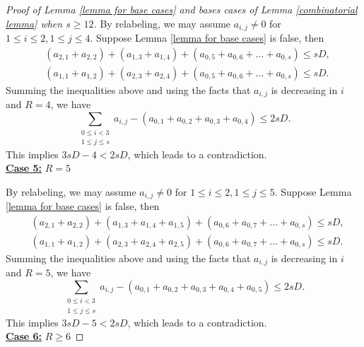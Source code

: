 \documentclass[10pt,a4paper]{amsart}
\begin{document}
\begin{proof}[Proof of Lemma \ref{lemma for base cases} and bases cases of Lemma \ref{combinatorial lemma} when $s\geq 12$]
    By relabeling, we may assume $a_{i,j}\neq 0$ for $1\leq i\leq 2,1\leq j\leq 4$. Suppose Lemma \ref{lemma for base cases} is false, then
    \begin{align*}
        &(a_{2,1}+a_{2,2})+(a_{1,3}+a_{1,4})+(a_{0,5}+a_{0,6}+...+a_{0,s})\leq sD,\\
        &(a_{1,1}+a_{1,2})+(a_{2,3}+a_{2,4})+(a_{0,5}+a_{0,6}+...+a_{0,s})\leq sD.
    \end{align*}
    Summing the inequalities above and using the facts that $a_{i,j}$ is decreasing in $i$ and $R=4$, we have
    \begin{equation*}
        \sum_{\substack{0\leq i<3\\1\leq j\leq s}}a_{i,j}-(a_{0,1}+a_{0,2}+a_{0,3}+a_{0,4})\leq 2sD.
    \end{equation*}
    This implies $3sD-4<2sD$, which leads to a contradiction.\\

    \noindent\underline{\textbf{Case 5:}} $R=5$

    By relabeling, we may assume $a_{i,j}\neq 0$ for $1\leq i\leq 2,1\leq j\leq 5$. Suppose Lemma \ref{lemma for base cases} is false, then
    \begin{align*}
        &(a_{2,1}+a_{2,2})+(a_{1,3}+a_{1,4}+a_{1,5})+(a_{0,6}+a_{0,7}+...+a_{0,s})\leq sD,\\
        &(a_{1,1}+a_{1,2})+(a_{2,3}+a_{2,4}+a_{2,5})+(a_{0,6}+a_{0,7}+...+a_{0,s})\leq sD.
    \end{align*}
    Summing the inequalities above and using the facts that $a_{i,j}$ is decreasing in $i$ and $R=5$, we have
    \begin{equation*}
        \sum_{\substack{0\leq i<3\\1\leq j\leq s}}a_{i,j}-(a_{0,1}+a_{0,2}+a_{0,3}+a_{0,4}+a_{0,5})\leq 2sD.
    \end{equation*}
    This implies $3sD-5<2sD$, which leads to a contradiction.\\

    \noindent\underline{\textbf{Case 6:}} $R\geq 6$


\end{proof}
\end{document}
